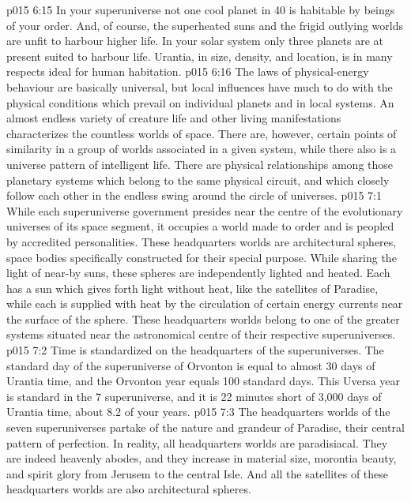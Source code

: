 \vs p015 6:15 In your superuniverse not one cool planet in 40 is habitable by beings of your order. And, of course, the superheated suns and the frigid outlying worlds are unfit to harbour higher life. In your solar system only three planets are at present suited to harbour life. Urantia, in size, density, and location, is in many respects ideal for human habitation.
\vs p015 6:16 The laws of physical\hyp{}energy behaviour are basically universal, but local influences have much to do with the physical conditions which prevail on individual planets and in local systems. An almost endless variety of creature life and other living manifestations characterizes the countless worlds of space. There are, however, certain points of similarity in a group of worlds associated in a given system, while there also is a universe pattern of intelligent life. There are physical relationships among those planetary systems which belong to the same physical circuit, and which closely follow each other in the endless swing around the circle of universes.
\vs p015 7:1 While each superuniverse government presides near the centre of the evolutionary universes of its space segment, it occupies a world made to order and is peopled by accredited personalities. These headquarters worlds are architectural spheres, space bodies specifically constructed for their special purpose. While sharing the light of near\hyp{}by suns, these spheres are independently lighted and heated. Each has a sun which gives forth light without heat, like the satellites of Paradise, while each is supplied with heat by the circulation of certain energy currents near the surface of the sphere. These headquarters worlds belong to one of the greater systems situated near the astronomical centre of their respective superuniverses.
\vs p015 7:2 \pc Time is standardized on the headquarters of the superuniverses. The standard day of the superuniverse of Orvonton is equal to almost 30 days of Urantia time, and the Orvonton year equals 100 standard days. This Uversa year is standard in the 7 superuniverse, and it is 22 minutes short of 3,000 days of Urantia time, about 8.2 of your years.
\vs p015 7:3 \pc The headquarters worlds of the seven superuniverses partake of the nature and grandeur of Paradise, their central pattern of perfection. In reality, all headquarters worlds are paradisiacal. They are indeed heavenly abodes, and they increase in material size, morontia beauty, and spirit glory from Jerusem to the central Isle. And all the satellites of these headquarters worlds are also architectural spheres.
